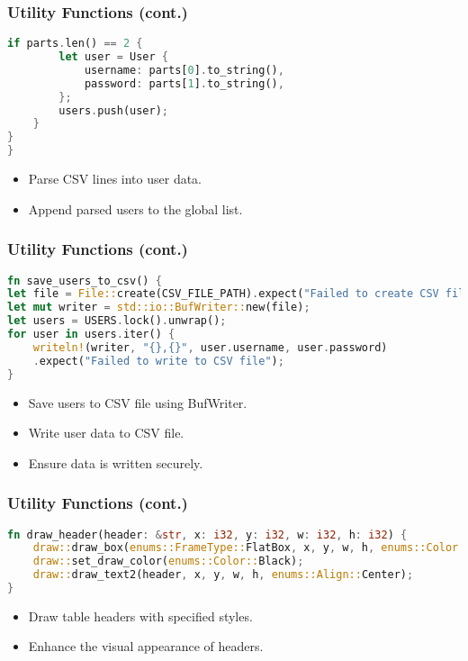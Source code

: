 \documentclass[aspectratio=169, table]{beamer}
\begin{document}
\begin{frame}[fragile]
\frametitle{Utility Functions (cont.)}
\begin{lstlisting}[language=Rust]
	if parts.len() == 2 {
		let user = User {
			username: parts[0].to_string(),
			password: parts[1].to_string(),
		};
		users.push(user);
	}
}
}


\end{lstlisting}
\begin{itemize}
\item Parse CSV lines into user data.
\item Append parsed users to the global list.

\end{itemize}
\end{frame}

\begin{frame}[fragile]
\frametitle{Utility Functions (cont.)}
\begin{lstlisting}[language=Rust]
fn save_users_to_csv() {
let file = File::create(CSV_FILE_PATH).expect("Failed to create CSV file");
let mut writer = std::io::BufWriter::new(file);
let users = USERS.lock().unwrap();
for user in users.iter() {
	writeln!(writer, "{},{}", user.username, user.password)
	.expect("Failed to write to CSV file");
}
\end{lstlisting}
\begin{itemize}
\item Save users to CSV file using BufWriter.
\item Write user data to CSV file.
\item Ensure data is written securely.
\end{itemize}
\end{frame}

\begin{frame}[fragile]
\frametitle{Utility Functions (cont.)}
\begin{lstlisting}[language=Rust]
fn draw_header(header: &str, x: i32, y: i32, w: i32, h: i32) {
	draw::draw_box(enums::FrameType::FlatBox, x, y, w, h, enums::Color::Dark3);
	draw::set_draw_color(enums::Color::Black);
	draw::draw_text2(header, x, y, w, h, enums::Align::Center);
}
\end{lstlisting}
\begin{itemize}
\item Draw table headers with specified styles.
\item Enhance the visual appearance of headers.
\end{itemize}
\end{frame}
\end{document}
